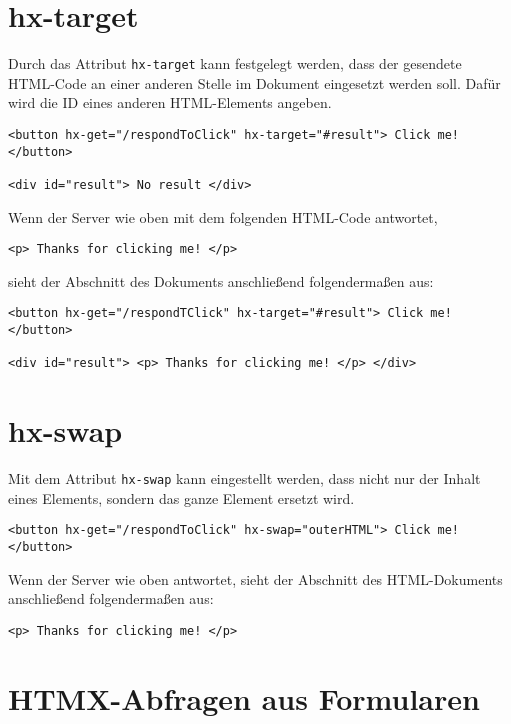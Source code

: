 \documentclass[a4paper]{scrartcl}
\begin{document}
\section{hx-target}\label{sec:hx-target}

Durch das Attribut \texttt{hx-target} kann festgelegt werden, dass der gesendete HTML-Code an einer anderen Stelle im Dokument eingesetzt werden soll.
Dafür wird die ID eines anderen HTML-Elements angeben.

\begin{verbatim}
<button hx-get="/respondToClick" hx-target="#result"> Click me! </button>

<div id="result"> No result </div>
\end{verbatim}

Wenn der Server wie oben mit dem folgenden HTML-Code antwortet,
\begin{verbatim}
<p> Thanks for clicking me! </p>
\end{verbatim}


sieht der Abschnitt des Dokuments anschließend folgendermaßen aus:

\begin{verbatim}
<button hx-get="/respondTClick" hx-target="#result"> Click me! </button>

<div id="result"> <p> Thanks for clicking me! </p> </div>
\end{verbatim}

\section{hx-swap}\label{sec:hx-swap}

Mit dem Attribut \texttt{hx-swap} kann eingestellt werden, dass nicht nur der Inhalt eines Elements, sondern das ganze Element ersetzt wird.

\begin{verbatim}
<button hx-get="/respondToClick" hx-swap="outerHTML"> Click me! </button>
\end{verbatim}

Wenn der Server wie oben antwortet, sieht der Abschnitt des HTML-Dokuments anschließend folgendermaßen aus:
\begin{verbatim}
<p> Thanks for clicking me! </p>
\end{verbatim}

\section{HTMX-Abfragen aus Formularen}\label{sec:htmx-abfragen-aus-formularen}
\end{document}
